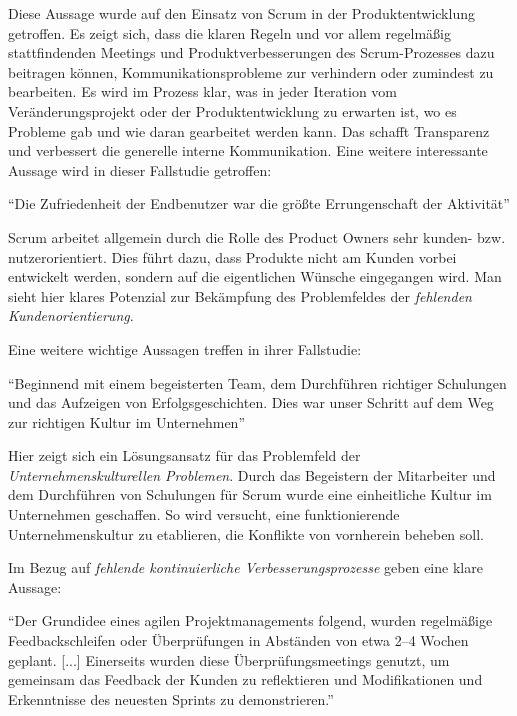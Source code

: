 Diese Aussage wurde auf den Einsatz von Scrum in der Produktentwicklung getroffen. Es zeigt sich, dass die klaren Regeln und vor allem regelmäßig stattfindenden Meetings und Produktverbesserungen des Scrum-Prozesses dazu beitragen können, Kommunikationsprobleme zur verhindern oder zumindest zu bearbeiten. Es wird im Prozess klar, was in jeder Iteration vom Veränderungsprojekt oder der Produktentwicklung zu erwarten ist, wo es Probleme gab und wie daran gearbeitet werden kann. Das schafft Transparenz und verbessert die generelle interne Kommunikation. Eine weitere interessante Aussage wird in dieser Fallstudie getroffen:

\begin{center}
	``Die Zufriedenheit der Endbenutzer war die größte Errungenschaft der Aktivität'' \cite[S. 4]{alawairdhi_agile_2016}
\end{center}

Scrum arbeitet allgemein durch die Rolle des Product Owners sehr kunden- bzw. nutzerorientiert. Dies führt dazu, dass Produkte nicht am Kunden vorbei entwickelt  werden, sondern auf die eigentlichen Wünsche eingegangen wird. Man sieht hier klares Potenzial  zur Bekämpfung des  Problemfeldes der \textit{fehlenden Kundenorientierung}.

Eine weitere wichtige Aussagen treffen  in ihrer Fallstudie:

\begin{center}
	``Beginnend mit einem begeisterten Team, dem Durchführen richtiger Schulungen und das Aufzeigen von Erfolgsgeschichten. Dies war unser Schritt auf dem Weg zur richtigen Kultur im Unternehmen'' \cite[S. 2]{anwar_agile_2016}
\end{center}

Hier zeigt sich ein Lösungsansatz für das Problemfeld der \textit{Unternehmenskulturellen Problemen}. Durch das Begeistern der Mitarbeiter und dem Durchführen von Schulungen für Scrum wurde eine einheitliche Kultur im Unternehmen geschaffen. So wird versucht, eine funktionierende Unternehmenskultur zu etablieren, die Konflikte von vornherein beheben soll.

Im Bezug auf \textit{fehlende kontinuierliche Verbesserungsprozesse} geben  eine klare Aussage:

\begin{center}
	``Der Grundidee eines agilen Projektmanagements folgend, wurden regelmäßige Feedbackschleifen oder Überprüfungen in Abständen von etwa 2–4 Wochen geplant. [...] Einerseits wurden diese Überprüfungsmeetings genutzt, um gemeinsam das Feedback der Kunden zu reflektieren und Modifikationen und Erkenntnisse des neuesten Sprints zu demonstrieren.'' \cite[S. 146]{urbach_digitalization_2018}
\end{center}

